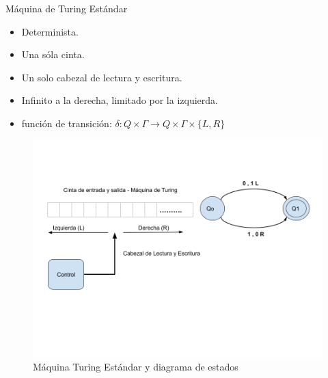 \documentclass[11pt]{beamer}
\begin{document}
		\begin{frame}{Máquina de Turing Estándar}
			\justifying
			
			\begin{itemize}
			    \item Determinista.
		        \item Una sóla cinta.
		        \item Un solo cabezal de lectura y escritura.
		        \item Infinito a la derecha, limitado por la izquierda.
		        \item función de transición: $\delta : Q \times \Gamma \rightarrow Q \times \Gamma \times \{ L, R \}$  \\
			\end{itemize}
		     
			\begin{figure}[H]
				\centering
				\includegraphics[scale=0.28]{img/standar.png}
				\caption{Máquina Turing Estándar y diagrama de estados}
				\label{fig: Standar}
			\end{figure}
		\end{frame}
	
\end{document}
